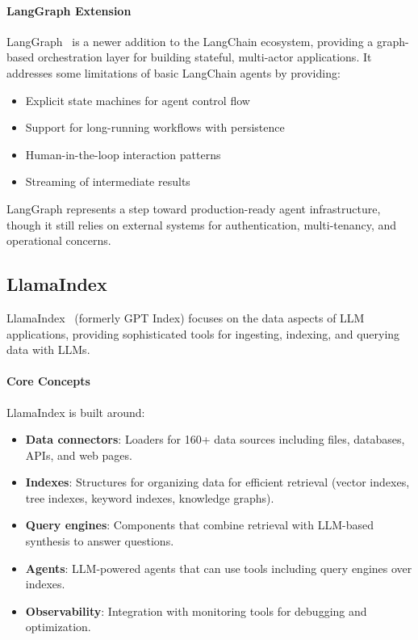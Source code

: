 \documentclass[a4paper,twoside]{sapthesis}
\begin{document}
\paragraph{LangGraph Extension}
LangGraph~\cite{langgraph2024}
is a newer addition to the LangChain ecosystem, providing a graph-based orchestration layer for building stateful, multi-actor applications. It addresses some limitations of basic LangChain agents by providing:
\begin{itemize}
    \item Explicit state machines for agent control flow
    \item Support for long-running workflows with persistence
    \item Human-in-the-loop interaction patterns
    \item Streaming of intermediate results
\end{itemize}

LangGraph represents a step toward production-ready agent infrastructure, though it still relies on external systems for authentication, multi-tenancy, and operational concerns.

\subsection{LlamaIndex}

LlamaIndex~\cite{llamaindex2023}
(formerly GPT Index) focuses on the data aspects of LLM applications, providing sophisticated tools for ingesting, indexing, and querying data with LLMs.

\paragraph{Core Concepts}
LlamaIndex is built around:
\begin{itemize}
    \item \textbf{Data connectors}: Loaders for 160+ data sources including files, databases, APIs, and web pages.
    \item \textbf{Indexes}: Structures for organizing data for efficient retrieval (vector indexes, tree indexes, keyword indexes, knowledge graphs).
    \item \textbf{Query engines}: Components that combine retrieval with LLM-based synthesis to answer questions.
    \item \textbf{Agents}: LLM-powered agents that can use tools including query engines over indexes.
    \item \textbf{Observability}: Integration with monitoring tools for debugging and optimization.
\end{itemize}
\end{document}
